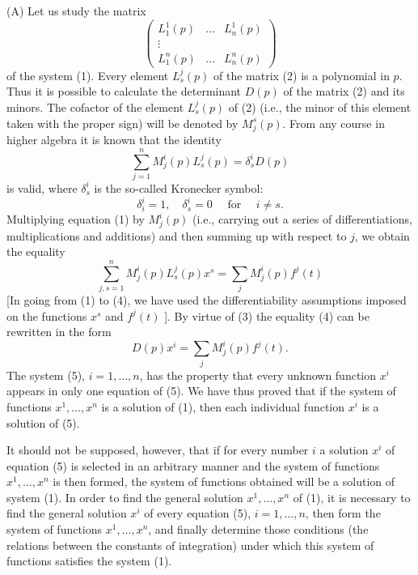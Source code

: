 \documentclass[10pt,a5paper]{book}
\theoremstyle{plain}
\theoremstyle{definition}
\theoremstyle{remark}
\begin{document}
(A) Let us study the matrix
\[
\left(\begin{array}{ccc}
L_{1}^{1}(p) & \ldots & L_{n}^{1}(p)  \tag{2}\\
\vdots & & \\
L_{1}^{n}(p) & \ldots & L_{n}^{n}(p)
\end{array}\right)
\]
of the system (1). Every element $L_{s}^{j}(p)$ of the matrix (2) is a polynomial in $p$. Thus it is possible to calculate the determinant $D(p)$ of the matrix (2) and its minors. The cofactor of the element $L_{s}^{j}(p)$ of (2) (i.e., the minor of this element taken with the proper sign) will be denoted by $M_{j}^{s}(p)$. From any course in higher algebra it is known that the identity
\begin{equation*}
\sum_{j=1}^{n} M_{j}^{i}(p) L_{s}^{j}(p)=\delta_{s}^{i} D(p) \tag{3}
\end{equation*}
is valid, where $\delta_{s}^{i}$ is the so-called Kronecker symbol:
\[
\delta_{i}^{i}=1, \quad \delta_{s}^{i}=0 \quad \text { for } \quad i \neq s .
\]
Multiplying equation (1) by $M_{j}^{i}(p)$ (i.e., carrying out a series of differentiations, multiplications and additions) and then summing up with respect to $j$, we obtain the equality
\begin{equation*}
\sum_{j, s=1}^{n} M_{j}^{i}(p) L_{s}^{j}(p) x^{s}=\sum_{j} M_{j}^{i}(p) f^{j}(t) \tag{4}
\end{equation*}
[In going from (1) to (4), we have used the differentiability assumptions imposed on the functions $x^{s}$ and $f^{j}(t)$ ]. By virtue of (3) the equality (4) can be rewritten in the form
\begin{equation*}
D(p) x^{i}=\sum_{j} M_{j}^{i}(p) f^{j}(t) . \tag{5}
\end{equation*}
The system (5), $i=1, \ldots, n$, has the property that every unknown
function $x^{i}$ appears in only one equation of (5). We have thus proved that if the system of functions $x^{1}, \ldots, x^{n}$ is a solution of (1), then each individual function $x^{i}$ is a solution of (5).

It should not be supposed, however, that if for every number $i$ a solution $x^{i}$ of equation (5) is selected in an arbitrary manner and the system of functions $x^{1}, \ldots, x^{n}$ is then formed, the system of functions obtained will be a solution of system (1). In order to find the general solution $x^{1}, \ldots, x^{n}$ of (1), it is necessary to find the general solution $x^{i}$ of every equation (5), $i=1, \ldots, n$, then form the system of functions $x^{1}, \ldots, x^{n}$, and finally determine those conditions (the relations between the constants of integration) under which this system of functions satisfies the system (1).
\end{document}
